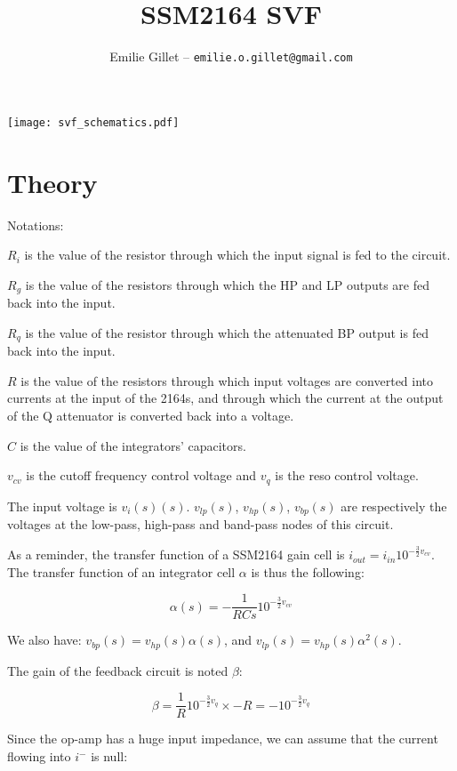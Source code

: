 \documentclass[a4paper,11pt]{article}
\title{SSM2164 SVF}
\author{Emilie Gillet -- \tt emilie.o.gillet@gmail.com}
\date{}
\begin{document}
\maketitle

\texttt{[image: svf\_schematics.pdf]}

\section{Theory}

Notations:

$R_i$ is the value of the resistor through which the input signal is fed to the circuit.

$R_g$ is the value of the resistors through which the HP and LP outputs are fed back into the input.

$R_q$ is the value of the resistor through which the attenuated BP output is fed back into the input.

$R$ is the value of the resistors through which input voltages are converted into currents at the input of the 2164s, and through which the current at the output of the Q attenuator is converted back into a voltage.

$C$ is the value of the integrators' capacitors.

$v_{cv}$ is the cutoff frequency control voltage and $v_{q}$ is the reso control voltage.


The input voltage is $v_i(s)(s)$. $v_{lp}(s)$, $v_{hp}(s)$, $v_{bp}(s)$ are respectively the voltages at the low-pass, high-pass and band-pass nodes of this circuit.

As a reminder, the transfer function of a SSM2164 gain cell is $i_{out} = i_{in} 10^{-\frac{3}{2} v_{cv}}$. The transfer function of an integrator cell $\alpha$ is thus the following:

\begin{equation}
\alpha(s) = -\frac{1}{RCs} 10^{-\frac{3}{2} v_{cv}}
\end{equation}

We also have: $v_{bp}(s) = v_{hp}(s) \alpha(s)$, and $v_{lp}(s) = v_{hp}(s) \alpha^2(s)$.

The gain of the feedback circuit is noted $\beta$:

\begin{equation}
\beta = \frac{1}{R} 10^{-\frac{3}{2} v_{q}} \times -R = -10^{-\frac{3}{2} v_{q}}
\end{equation}

Since the op-amp has a huge input impedance, we can assume that the current flowing into $i^-$ is null:
\end{document}
